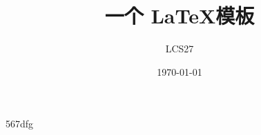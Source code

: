 \documentclass[a4paper,twoside,12pt]{article}
\title{一个 \LaTeX 模板}
\author{LCS27}
\date{\today}
\begin{document}
\maketitle
567dfg
\end{document}
